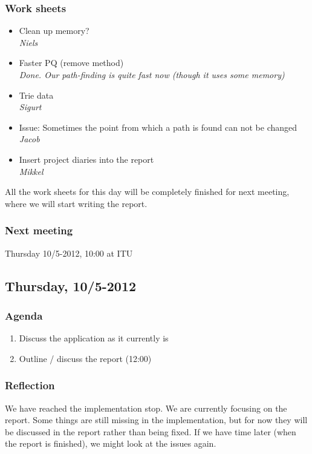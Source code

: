 \documentclass[a4paper,11pt]{article}
\begin{document}
\subsubsection*{Work sheets}
\begin{itemize}
	\item Clean up memory? \\
		\textsl{Niels}
	\item Faster PQ (remove method) \\
		\textsl{Done. Our path-finding is quite fast now (though it uses some memory)}
	\item Trie data \\
		\textsl{Sigurt}
	\item Issue: Sometimes the point from which a path is found can not be changed \\
		\textsl{Jacob}
	\item Insert project diaries into the report \\
		\textsl{Mikkel}
\end{itemize}
All the work sheets for this day will be completely finished for next meeting, where we will start writing the report.

\subsubsection*{Next meeting}
Thursday 10/5-2012, 10:00 at ITU


\pagebreak
\subsection{Thursday, 10/5-2012}

\subsubsection*{Agenda}
\begin{enumerate}
	\item Discuss the application as it currently is
	\item Outline / discuss the report (12:00)
\end{enumerate}

\subsubsection*{Reflection}
We have reached the implementation stop. We are currently focusing on the report. Some things are still missing in the implementation, but for now they will be discussed in the report rather than being fixed. If we have time later (when the report is finished), we might look at the issues again.
\end{document}
